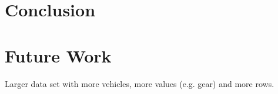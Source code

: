 \section{Conclusion}


\section{Future Work}
Larger data set with more vehicles, more values (e.g. gear) and more rows.
 